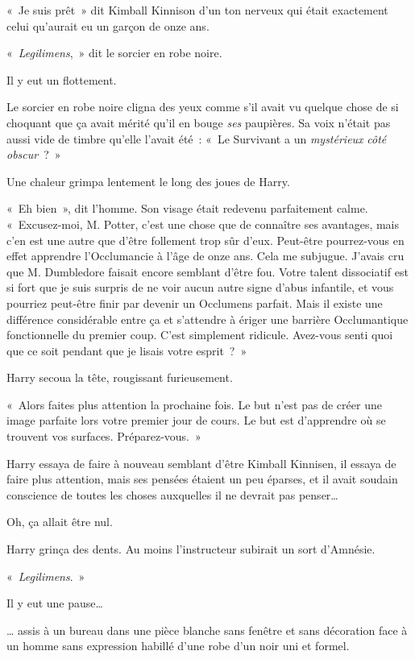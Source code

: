 «~Je suis prêt~» dit Kimball Kinnison d'un ton nerveux qui était exactement celui qu'aurait eu un garçon de onze ans.

«~\emph{Legilimens},~» dit le sorcier en robe noire.

Il y eut un flottement.

Le sorcier en robe noire cligna des yeux comme s'il avait vu quelque chose de si choquant que ça avait mérité qu'il en bouge \emph{ses} paupières. Sa voix n'était pas aussi vide de timbre qu'elle l'avait été~: «~Le Survivant a un \emph{mystérieux} \emph{côté obscur}~?~»

Une chaleur grimpa lentement le long des joues de Harry.

«~Eh bien~», dit l'homme. Son visage était redevenu parfaitement calme. «~Excusez-moi, M. Potter, c'est une chose que de connaître ses avantages, mais c'en est une autre que d'être follement trop sûr d'eux. Peut-être pourrez-vous en effet apprendre l'Occlumancie à l'âge de onze ans. Cela me subjugue. J'avais cru que M. Dumbledore faisait encore semblant d'être fou. Votre talent dissociatif est si fort que je suis surpris de ne voir aucun autre signe d'abus infantile, et vous pourriez peut-être finir par devenir un Occlumens parfait. Mais il existe une différence considérable entre ça et s'attendre à ériger une barrière Occlumantique fonctionnelle du premier coup. C'est simplement ridicule. Avez-vous senti quoi que ce soit pendant que je lisais votre esprit~?~»

Harry secoua la tête, rougissant furieusement.

«~Alors faites plus attention la prochaine fois. Le but n'est pas de créer une image parfaite lors votre premier jour de cours. Le but est d'apprendre où se trouvent vos surfaces. Préparez-vous.~»

Harry essaya de faire à nouveau semblant d'être Kimball Kinnisen, il essaya de faire plus attention, mais ses pensées étaient un peu éparses, et il avait soudain conscience de toutes les choses auxquelles il ne devrait pas penser…

Oh, ça allait être nul.

Harry grinça des dents. Au moins l'instructeur subirait un sort d'Amnésie.

«~\emph{Legilimens}.~»

Il y eut une pause…

… assis à un bureau dans une pièce blanche sans fenêtre et sans décoration face à un homme sans expression habillé d’une robe d'un noir uni et formel.

